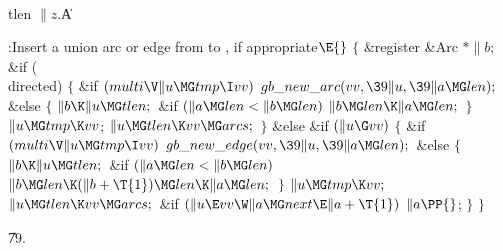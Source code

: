 \Y\B\4\D\\{tlen}\5
$\|z.{}$\|A\par
\Y\B\4:Insert a union arc or edge from  to , if
appropriate\X${}\E{}$\6
${}\{{}$\5
\1\&{register} \&{Arc} ${}{*}\|b;{}$\7
\&{if} (\\{directed})\5
${}\{{}$\1\6
\&{if} ${}(\\{multi}\V\|u\MG\\{tmp}\I\\{vv}){}$\1\5
${}\\{gb\_new\_arc}(\\{vv},\39\|u,\39\|a\MG\\{len});{}$\2\6
\&{else}\5
${}\{{}$\1\6
${}\|b\K\|u\MG\\{tlen};{}$\6
\&{if} ${}(\|a\MG\\{len}<\|b\MG\\{len}){}$\1\5
${}\|b\MG\\{len}\K\|a\MG\\{len};{}$\2\6
\4${}\}{}$\2\6
${}\|u\MG\\{tmp}\K\\{vv}{}$;\6
${}\|u\MG\\{tlen}\K\\{vv}\MG\\{arcs};{}$\6
\4${}\}{}$\5
\2\&{else} \&{if} ${}(\|u\G\\{vv}){}$\5
${}\{{}$\1\6
\&{if} ${}(\\{multi}\V\|u\MG\\{tmp}\I\\{vv}){}$\1\5
${}\\{gb\_new\_edge}(\\{vv},\39\|u,\39\|a\MG\\{len});{}$\2\6
\&{else}\5
${}\{{}$\1\6
${}\|b\K\|u\MG\\{tlen};{}$\6
\&{if} ${}(\|a\MG\\{len}<\|b\MG\\{len}){}$\1\5
${}\|b\MG\\{len}\K(\|b+\T{1})\MG\\{len}\K\|a\MG\\{len};{}$\2\6
\4${}\}{}$\2\6
${}\|u\MG\\{tmp}\K\\{vv};{}$\6
${}\|u\MG\\{tlen}\K\\{vv}\MG\\{arcs};{}$\6
\&{if} ${}(\|u\E\\{vv}\W\|a\MG\\{next}\E\|a+\T{1}){}$\1\5
${}\|a\PP{}$;\2\6
\4${}\}{}$\2\6
\4${}\}{}$\2\par
\U79.\fi

